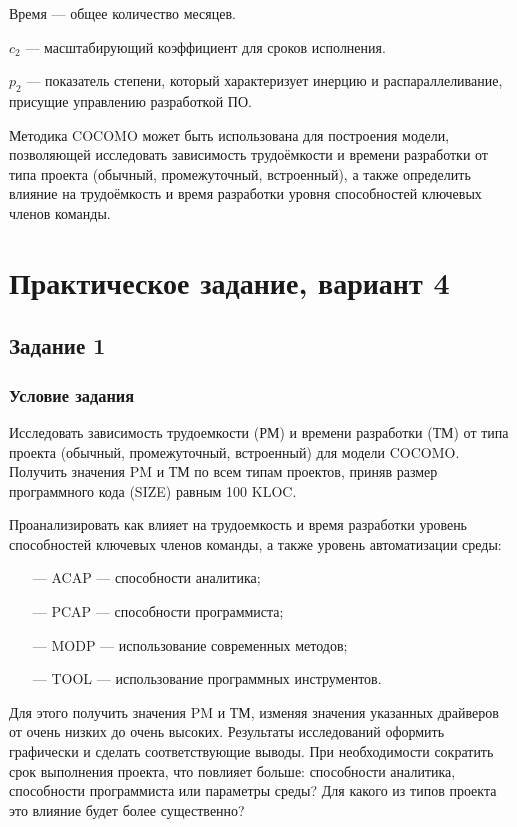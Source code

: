 Время --- общее количество месяцев.

$c_2$ --- масштабирующий коэффициент для сроков исполнения.

$p_2$ --- показатель степени, который характеризует инерцию и распараллеливание, присущие управлению разработкой ПО.

Методика COCOMO может быть использована для построения модели, позволяющей исследовать зависимость трудоёмкости и времени разработки от типа проекта (обычный, промежуточный, встроенный), а также определить влияние на трудоёмкость и время разработки уровня способностей ключевых членов команды.

\section*{Практическое задание, вариант 4}

\subsection*{Задание 1}

\subsubsection{Условие задания}

Исследовать зависимость трудоемкости (РМ) и времени разработки (ТМ) от типа проекта (обычный, промежуточный, встроенный) для модели COCOMO. Получить значения PM и ТМ по всем типам проектов, приняв размер программного кода (SIZE) равным 100 KLOC. 

Проанализировать как влияет на трудоемкость и время разработки уровень способностей ключевых членов команды, а также уровень автоматизации среды:
\begin{itemize}
    \item[---] ACAP --- способности аналитика;
    \item[---] PCAP --- способности программиста;
    \item[---] MODP --- использование современных методов;
    \item[---] TOOL --- использование программных инструментов.
\end{itemize}

Для этого получить значения PM и ТМ, изменяя значения указанных драйверов от очень низких до очень высоких.
Результаты исследований оформить графически и сделать соответствующие выводы. 
При необходимости сократить срок выполнения проекта, что повлияет больше: способности аналитика, способности программиста или параметры среды? Для какого из типов проекта это влияние будет более существенно?


